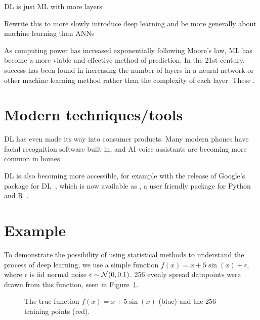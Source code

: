\begin{todo}
	DL is just ML with more layers
\end{todo}

\begin{todo}
	Rewrite this to more slowly introduce deep learning and be more generally about machine learning than ANNs
\end{todo}
As computing power has increased exponentially following Moore's law, \ac{ML} has become a more viable and effective method of prediction.
In the 21st century, success has been found in increasing the number of layers in a neural network or other machine learning method rather than the complexity of each layer.
These  .

\section{Modern techniques/tools}

\ac{DL} has even made its way into consumer products.
Many modern phones have facial recognition software built in, and \ac{AI} voice assistants are becoming more common in homes.

\ac{DL} is also becoming more accessible, for example with the release of Google's  package for \ac{DL}~\autocite{abadi2016}, which is now available as , a user friendly package for Python~\autocite{chollet2015} and R~\autocite{allaire2018}.

\section{Example}

To demonstrate the possibility of using statistical methods to understand the process of deep learning, we use a simple function \(f(x) = x + 5 \sin(x) + \epsilon\), where \(\epsilon\) is iid normal noise \(\epsilon \sim \mathcal{N}(0, 0.1)\).
256 evenly spread datapoints were drawn from this function, seen in Figure~\ref{fig:sin-x-dataset}.

\begin{figure}[htbp]
	\centering
	
	\caption{The true function \(f(x) = x + 5 \sin(x)\) (blue) and the 256 training points (red).}
	\label{fig:sin-x-dataset}
\end{figure}

